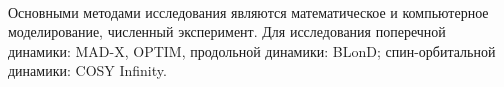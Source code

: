 ~\\
\par {\methods} Основными методами исследования являются математическое и компьютерное моделирование, численный эксперимент. Для исследования поперечной динамики: MAD-X, OPTIM, продольной динамики: BLonD; спин-орбитальной динамики: COSY Infinity.
~\\
\begin{comment}
\par {\defpositions}
\begin{enumerate}[beginpenalty=10000] %
  \item 	Принципы построения дуальной магнитооптической структуры с оптимизированным временем жизни пучка в регулярной структуре для многозарядных тяжелых ионов и варьированной критической энергией в резонансной структуре для легких ядер; \cite{Kolokolchikov:2025_dual}, \cite{Syresin:2021_polar}
  \item	Результаты, полученные в эксперименте на У-70 и в методе численного моделирования динамики продольного движения вблизи критической энергии с учётом влияния высших порядков зависимости от разброса по импульсу и с учетом импеданса; \cite{Kolokolchikov:2025_U70}, \cite{Kolokolchikov:2025_jump}
  \item	Результаты исследования продольной динамики поляризованного пучка для процедуры скачка критической энергии в гармоническом и барьерном ВЧ, оценка влияния продольной микроволновой неустойчивости; \cite{Kolokolchikov:2024_bb_rupac}, \cite{Kolokolchikov:2023_bb_IPAC}, \cite{Kolokolchikov:2024_bb_dspin}
  \item	Метод подавления дисперсии и влияния нелинейных эффектов, из-за нарушения периодичности за счет введения missing magnet на краях поворотных арок, для создания резонансной магнитооптической структуры; \cite{Kolokolchikov:2021trans}, \cite{Kolokolchikov:2023_pecular}
  \item	Модернизированная структура с квази-замороженным спином для исследования ЭДМ дейтронов и протонов и возможностью совместного использования Нуклотрона в качестве бустера поляризованных частиц для коллайдера; \cite{Senichev:2023_QFS}, \cite{Senichev:2023_nuclotron}, \cite{Kolokolchikov:2025_nuclotron}
  \item	Метод обводных каналов bypass для независимого исследования ЭДМ в кольце коллайдера;\cite{Kolokolchikov:2023_bypass}, \cite{Kolokolchikov:2023_bypass_IPAC}, \cite{Senichev:2024_nica_edm}, \cite{Kolokolchikov:2023_sc}, \cite{Kolokolchikov:2023_sc_IPAC}
\end{enumerate}
\end{comment}

